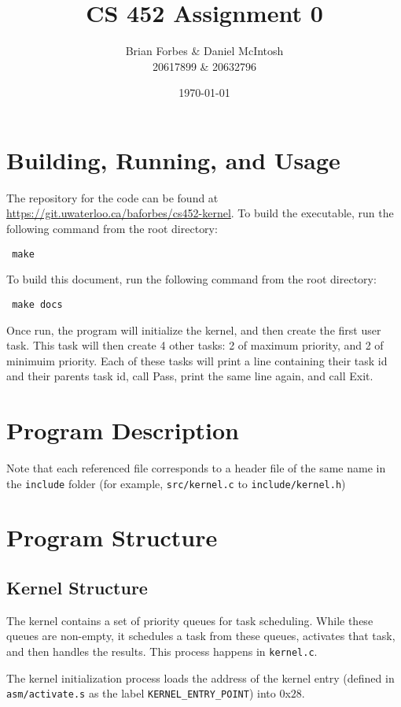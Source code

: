 \documentclass{article}
\begin{document}
\title{CS 452 Assignment 0}
\author{Brian Forbes \& Daniel McIntosh \\ 20617899 \& 20632796}
\date{\today}

\maketitle

\section{Building, Running, and Usage}

The repository for the code can be found at \url{https://git.uwaterloo.ca/baforbes/cs452-kernel}. 
To build the executable, run the following command from the root directory: \begin{verbatim} make \end{verbatim}
To build this document, run the following command from the root directory: \begin{verbatim} make docs \end{verbatim}

Once run, the program will initialize the kernel, and then create the first user task. This task will then create 4 other tasks: 2 of maximum priority, and 2 of minimuim priority. Each of these tasks will print a line containing their task id and their parents task id, call Pass, print the same line again, and call Exit.

\section{Program Description}
Note that each referenced file corresponds to a header file of the same name in the \verb|include| folder (for example, \verb|src/kernel.c| to \verb|include/kernel.h|)

\section{Program Structure}
\subsection{Kernel Structure}
The kernel contains a set of priority queues for task scheduling. While these queues are non-empty, it schedules a task from these queues, activates that task, and then handles the results. This process happens in \verb|kernel.c|.

The kernel initialization process loads the address of the kernel entry (defined in \verb|asm/activate.s| as the label \verb|KERNEL_ENTRY_POINT|) into $0$x$28$.
\end{document}
